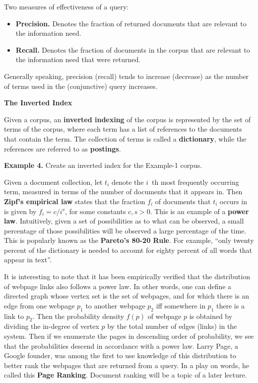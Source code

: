 \documentclass [12pt]{article}
\begin{document}
\vspace{0.5in}
Two measures of effectiveness of a query:


\begin{itemize}
\item \textbf{Precision.} Denotes the fraction of returned documents that are relevant to the 
information need. 

\item \textbf{Recall.} Denotes the fraction of documents in the corpus that are relevant to the information need that were returned.
\end{itemize}

Generally speaking, precision (recall) tends to increase (decrease)
 as the number of terms used in the (conjunctive) query increases.



\newpage
\noindent
\begin{center} \textbf{The Inverted Index}\end{center}

Given a corpus, an \textbf{inverted indexing} of the corpus is represented by the set of terms
of the corpus, where each term has a list of references to the documents that contain the term.
The collection of terms is called a \textbf{dictionary}, while the references are referred to 
as \textbf{postings}.

\vspace{0.5in}
\textbf{Example 4.} Create an inverted index for the Example-1 corpus.


\newpage
Given a document collection, let $t_{i}$ denote the $i$~th most frequently occurring term,
measured in terms of the number of documents that it appears in. Then 
\textbf{Zipf's empirical law} states that the fraction $f_{i}$ of documents that $t_{i}$ 
occurs in is given by $f_{i}=c/i^{s}$, for some constants $c,s > 0$. This is an example of a 
\textbf{power law}. Intuitively, given a set of possibilities as to what can be observed, a small percentage
of those possibilities will be observed a large percentage of the time. This is popularly known as the
\textbf{Pareto's 80-20 Rule}. For example, ``only twenty percent of the dictionary is needed to account for eighty
percent of all words that appear in text''.

It is interesting to note that it has been empirically verified that the distribution of webpage links also follows
a power law. In other words, one can define a directed graph whose vertex set is the set of webpages, and for which
there is an edge from one webpage $p_{1}$ to another webpage $p_{2}$ iff somewhere in $p_{1}$ there is a link to
$p_{2}$. Then the probability density $f(p)$ of webpage $p$ is obtained by dividing the in-degree of vertex $p$ by the
total number of edges (links) in the system. Then if we enumerate the pages in descending order of probability, we
see that the probabilities descend in accordance with a power law. Larry Page, a Google founder, was among the first to
use knowledge of this distribution to better rank the webpages that are returned from a query. In a play on words,
he called this \textbf{Page Ranking}. Document ranking will be a topic of a later lecture.
\end{document}
